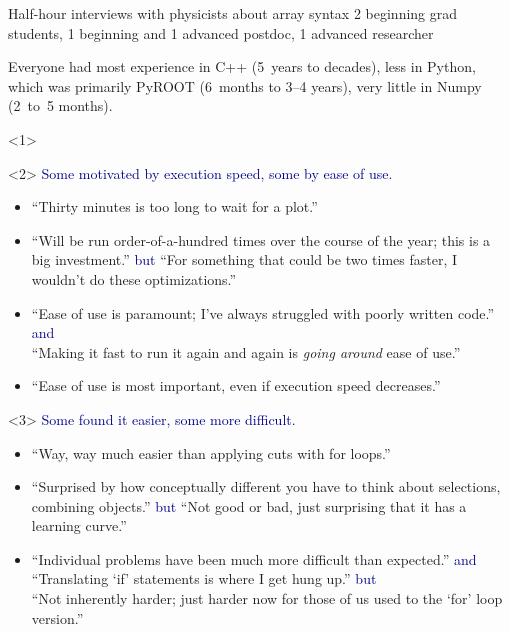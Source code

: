 \documentclass[aspectratio=169]{beamer}
\begin{document}
\begin{frame}{Half-hour interviews with physicists about array syntax}
\vspace{0.5 cm}
2 beginning grad students, 1 beginning and 1 advanced postdoc, 1 advanced researcher

\vspace{0.5 cm}
Everyone had most experience in C++ (5~years to decades), less in Python, which was primarily PyROOT (6~months to 3--4 years), very little in Numpy (2~to~5 months).

\vspace{0.5 cm}

\begin{onlyenv}<1>
\vspace{6 cm}
\end{onlyenv}

\begin{onlyenv}<2>
\textcolor{darkblue}{Some motivated by execution speed, some by ease of use.}
\small
\begin{itemize}
\item ``Thirty minutes is too long to wait for a plot.''
\item ``Will be run order-of-a-hundred times over the course of the year; this is a big investment.'' \textcolor{darkblue}{but} ``For something that could be two times faster, I wouldn't do these optimizations.''
\item ``Ease of use is paramount; I've always struggled with poorly written code.'' \textcolor{darkblue}{and} \\ ``Making it fast to run it again and again is {\it going around} ease of use.''
\item ``Ease of use is most important, even if execution speed decreases.''
\end{itemize}
\vspace{0.5 cm}
\end{onlyenv}

\begin{onlyenv}<3>
\textcolor{darkblue}{Some found it easier, some more difficult.}
\small
\begin{itemize}
\item ``Way, way much easier than applying cuts with for loops.''
\item ``Surprised by how conceptually different you have to think about selections, combining objects.'' \textcolor{darkblue}{but} ``Not good or bad, just surprising that it has a learning curve.''
\item ``Individual problems have been much more difficult than expected.'' \textcolor{darkblue}{and} \\ ``Translating `if' statements is where I get hung up.'' \textcolor{darkblue}{but} \\ ``Not inherently harder; just harder now for those of us used to the `for' loop version.''
\end{itemize}
\vspace{1 cm}
\end{onlyenv}


\end{frame}
\end{document}
